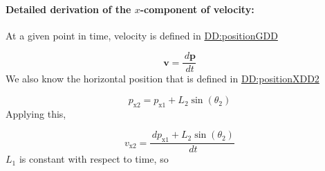 \documentclass[12pt]{article}
\begin{document}
\paragraph{Detailed derivation of the $x$-component of velocity:}
\label{GD:velocityX2Deriv}
At a given point in time, velocity is defined in \hyperref[DD:positionGDD]{DD:positionGDD}

\begin{displaymath}
\symbf{v}=\frac{\,d\symbf{p}}{\,dt}
\end{displaymath}
We also know the horizontal position that is defined in \hyperref[DD:positionXDD2]{DD:positionXDD2}

\begin{displaymath}
{p_{\text{x}2}}={p_{\text{x}1}}+{L_{2}} \sin\left({θ_{2}}\right)
\end{displaymath}
Applying this,

\begin{displaymath}
{v_{\text{x}2}}=\frac{\,d{p_{\text{x}1}}+{L_{2}} \sin\left({θ_{2}}\right)}{\,dt}
\end{displaymath}
${L_{1}}$ is constant with respect to time, so
\end{document}
